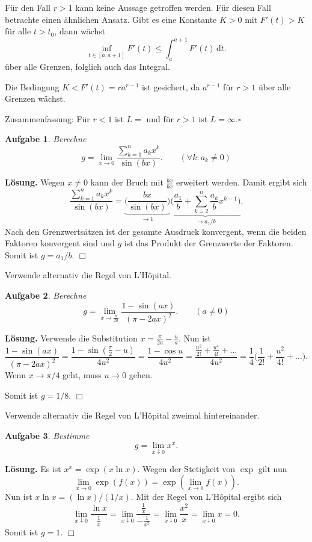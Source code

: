\documentclass[a4paper,10pt,fleqn,twoside]{scrartcl}
\numberwithin{equation}{section}
\newcommand{\strong}[1]{{\normalfont\sffamily\bfseries #1}}
\renewcommand{\qedsymbol}{\ensuremath{\square}}
\theoremstyle{Aufgabe}
\newtheorem{Aufgabe}{\sffamily Aufgabe}[section]
\begin{document}
Für den Fall $r>1$ kann keine Aussage getroffen werden. Für diesen
Fall betrachte einen ähnlichen Ansatz. Gibt es eine Konstante $K>0$
mit $F'(t)>K$ für alle $t>t_0$, dann wächst%
\[\inf_{t\in[a,a+1]}F'(t) \le \int_a^{a+1} F'(t)\,\mathrm dt.\]
über alle Grenzen, folglich auch das Integral.

Die Bedingung $K<F'(t)=ra^{r-1}$ ist gesichert, da $a^{r-1}$
für $r>1$ über alle Grenzen wächst.

Zusammenfassung: Für $r<1$ ist $L=$ und
für $r>1$ ist $L=\infty$.\;\qedsymbol

\begin{Aufgabe}
Berechne
\[g = \lim_{x\to 0}\frac{\sum_{k=1}^n a_k x^k}{\sin(bx)}.
\qquad(\forall k\colon a_k\ne 0)\]
\end{Aufgabe}
\noindent
\strong{Lösung.}
Wegen $x\ne 0$ kann der Bruch mit $\frac{bx}{bx}$ erweitert
werden. Damit ergibt sich%
\[
\frac{\sum_{k=1}^n a_k x^k}{\sin(bx)}
= \underbrace{\bigg(\frac{bx}{\sin(bx)}\bigg)}_{\to 1}
\underbrace{\bigg(\frac{a_1}{b}+\sum_{k=2}^n\frac{a_k}{b}x^{k-1}\bigg)}_{\to a_1/b}.
\]
Nach den Grenzwertsätzen ist der gesamte Ausdruck konvergent, wenn
die beiden Faktoren konvergent sind und $g$ ist das Produkt
der Grenzwerte der Faktoren. Somit ist $g=a_1/b$. $\Box$

Verwende alternativ die Regel von L'Hôpital.

\begin{Aufgabe}
Berechne
\[g = \lim_{x\to\frac{\pi}{2a}} \frac{1-\sin(ax)}{(\pi-2ax)^2}.
\qquad(a\ne 0)\]
\end{Aufgabe}
\noindent
\strong{Lösung.}
Verwende die Substitution $x=\frac{\pi}{2a}-\frac{u}{a}$.
Nun ist%
\[
\frac{1-\sin(ax)}{(\pi-2ax)^2}
= \frac{1-\sin(\frac{\pi}{2}-u)}{4u^2}
= \frac{1-\cos u}{4u^2}
= \frac{\frac{u^2}{2!}+\frac{u^4}{4!}+\ldots}{4u^2}
= \frac{1}{4} \Big(\frac{1}{2!}+\frac{u^2}{4!}+\ldots\Big).
\]
Wenn $x\to\pi/4$ geht, muss $u\to 0$ gehen.

Somit ist $g=1/8$. $\Box$

Verwende alternativ die Regel von L'Hôpital zweimal hintereinander.

\begin{Aufgabe}
Bestimme
\[g=\lim_{x\downarrow 0} x^x.\]
\end{Aufgabe}
\noindent
\strong{Lösung.} Es ist $x^x=\exp(x\ln x)$.
Wegen der Stetigkeit von $\exp$ gilt nun
\begin{equation}
\lim_{x\to 0}\exp(f(x)) = \exp(\lim_{x\to 0} f(x)).
\end{equation}
Nun ist $x\ln x = (\ln x)/(1/x).$
Mit der Regel von L'Hôpital ergibt sich
\begin{equation}
\lim_{x\downarrow 0} \frac{\ln x}{\frac{1}{x}}
= \lim_{x\downarrow 0} \frac{\frac{1}{x}}{-\frac{1}{x^2}}
= \lim_{x\downarrow 0}\frac{x^2}{x}
= \lim_{x\downarrow 0} x = 0.
\end{equation}
Somit ist $g=1$. $\Box$
\end{document}
